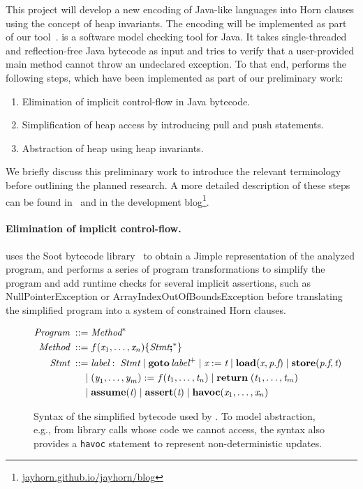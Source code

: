 
This project will develop a new encoding of Java-like languages into Horn clauses 
using the concept of heap invariants. The encoding will be implemented as part
of our \jayhorn tool~\cite{jayhorn16}. \jayhorn is a software model 
checking tool for Java. It takes single-threaded and reflection-free Java bytecode
as input and tries to verify that a user-provided \textsf{main} method cannot throw an
undeclared exception. To that end, \jayhorn performs the following steps, which have been implemented as part of our preliminary work:
\begin{enumerate}
\item Elimination of implicit control-flow in Java bytecode.
\item Simplification of heap access by introducing pull
and push statements.
\item Abstraction of heap using heap invariants.
\end{enumerate}
We briefly discuss this preliminary work to introduce the relevant terminology
before outlining the planned research. A more detailed description of these 
steps can be found in~\cite{jayhorn16} and in the \jayhorn development 
blog\footnote{\url{jayhorn.github.io/jayhorn/blog}}. 


\paragraph{Elimination of implicit control-flow.}
\jayhorn uses the Soot bytecode library~\cite{vall99soot} to obtain a 
Jimple representation of the analyzed program, and performs a series of program 
transformations to simplify the program and add runtime checks for several implicit
assertions, such as Null\-Pointer\-Exception or 
Array\-Index\-Out\-Of\-Bounds\-Exception before translating the 
simplified program into a system of constrained Horn clauses.
\begin{figure}[tb]
\begin{center}
\begin{align*}
\textit{Program} \; ::= & \; \textit{Method}^* \\
\textit{Method} \; ::= & \; f(\textit{x}_1, \ldots,
\textit{x}_n)\{\textit{Stmt}\textbf{;}^*\}\\
 \textit{Stmt} \; ::= & \; \textit{label}:\; \textit{Stmt} 
\; |   \; \textbf{goto} \,  \textit{label}^+
\; |  \; \textit{x}:= \textit{t}
\; |   \; \textbf{load}(\textit{x}, \textit{p}.\textit{f}) 
\; |   \; \textbf{store}(\textit{p}.\textit{f}, \textit{t}) \\
| & 
 \; (\textit{y}_1, \ldots, \textit{y}_m) := f(\textit{t}_1, \ldots, \textit{t}_n)
 \; | \; \textbf{return} \; (\textit{t}_1, \ldots, \textit{t}_m)
\\
| & 
 \; \textbf{assume}(\textit{t}) \;  | \; \textbf{assert}(\textit{t}) 
 \;  | \; \textbf{havoc}(\textit{x}_1,\ldots,\textit{x}_n) 
\end{align*}
\end{center}
\caption{Syntax of the simplified bytecode used by \jayhorn. To model abstraction, e.g., from library calls whose code we cannot access, the syntax also provides a \texttt{havoc} statement to represent non-deterministic updates.\label{fig-syntax}}
\end{figure}

